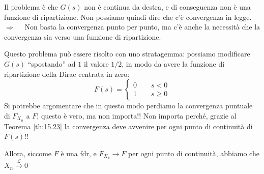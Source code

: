 \begin{esempio}
\begin{figure}[H]
    \end{figure}    

    Il problema è che $G(s)$ non è continua da destra, e di conseguenza non è una funzione di ripartizione. Non possiamo quindi dire che c'è convergenza in legge.\\
    $\Rightarrow \quad $ Non basta la convergenza punto per punto, ma c'è anche la necessità che la convergenza sia verso una funzione di ripartizione.    

    \medskip
    Questo problema può essere risolto con uno stratagemma: possiamo modificare $G(s)$ ``spostando'' ad $1$ il valore $1/2$, in modo da avere la funzione di ripartizione della Dirac centrata in zero:
    \[F(s) = \begin{cases}
        0\qquad s<0\\
        1\qquad s\geq0
    \end{cases}\]
    Si potrebbe argomentare che in questo modo perdiamo la convergenza puntuale di $F_{X_n}$ a $F$; questo è vero, ma non importa!! Non importa perché, grazie al Teorema \ref{th:15.23} la convergenza deve avvenire per ogni punto di continuità di $F(s)$!!

    \medskip
    Allora, siccome $F$ è una fdr, e $F_{X_k}\longrightarrow F$ per ogni punto di continuità, abbiamo che $X_n \overset{\mathcal{L}}{\longrightarrow} 0$
\end{esempio}

